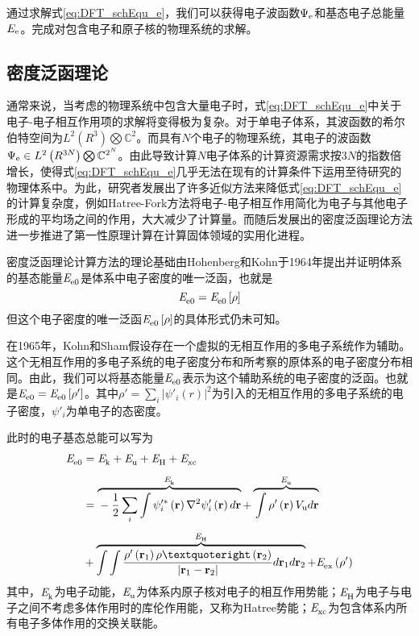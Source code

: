 通过求解式\ref{eq:DFT_schEqu_e}，我们可以获得电子波函数$\Psi_{\rm e}$和基态电子总能量$E_{\rm e}$。完成对包含电子和原子核的物理系统的求解。

\subsection{密度泛函理论}
通常来说，当考虑的物理系统中包含大量电子时，式\ref{eq:DFT_schEqu_e}中关于电子-电子相互作用项的求解将变得极为复杂。对于单电子体系，其波函数的希尔伯特空间为$L^2\left(R^3\right)\bigotimes \mathbb{C}^2$。而具有$N$个电子的物理系统，其电子的波函数$\Psi_{\rm e}\in L^2\left(R^{3N}\right)\bigotimes \mathbb{C}^{2^N}$。由此导致计算$N$电子体系的计算资源需求按$3N$的指数倍增长，使得式\ref{eq:DFT_schEqu_e}几乎无法在现有的计算条件下运用至待研究的物理体系中。为此，研究者发展出了许多近似方法来降低式\ref{eq:DFT_schEqu_e}的计算复杂度，例如Hatree-Fork方法将电子-电子相互作用简化为电子与其他电子形成的平均场之间的作用，大大减少了计算量。而随后发展出的密度泛函理论方法进一步推进了第一性原理计算在计算固体领域的实用化进程。

密度泛函理论计算方法的理论基础由Hohenberg和Kohn于1964年提出并证明\chinesecolon 体系的基态能量$\it E_{\rm e0}^{\rm } \it$是体系中电子密度的唯一泛函，也就是
\[
    \it E_{\rm e0}^{\rm } \it=\it E_{\rm e0}^{\rm } \it\left[\rho\right]
\]
但这个电子密度的唯一泛函$\it E_{\rm e0}^{\rm } \it\left[\rho\right]$的具体形式仍未可知。

在1965年，Kohn和Sham假设存在一个虚拟的无相互作用的多电子系统作为辅助。这个无相互作用的多电子系统的电子密度分布和所考察的原体系的电子密度分布相同。由此，我们可以将基态能量$\it E_{\rm e0}^{\rm } \it$表示为这个辅助系统的电子密度的泛函。也就是$\it E_{\rm e0}^{\rm } \it=\it E_{\rm e0}^{\rm } \it\left[\rho'\right]$。其中$\rho'=\sum_i\left\lvert \psi' _i\left(r\right)\right\rvert^2$为引入的无相互作用的多电子系统的电子密度，$\psi'_i$为单电子的态密度。

此时的电子基态总能可以写为\chinesecolon
\begin{equation}
    \label{eq:DFT_Ee0_ks}
    \begin{split}
        \energyVar{e0}{}&=\energyVar{k}{}+\energyVar{u}{}+\energyVar{H}{}+\energyVar{xc}{}\\[+1ex]
        &=\overbrace{\rule[0ex]{0ex}{3.2ex}-\frac{1}{2}\sum_i\int\psi'^*_i\left({\bm r}\right)\nabla^2\psi'_i\left({\bm r}\right)d{\bm r}}^{\energyVar{k}{}} + \overbrace{\rule[0ex]{0ex}{3.2ex}\int\rho'\left({\bm r}\right)V_{\rm u}d{\bm r}}^{\energyVar{u}{}}\\[+1ex]
        &+\overbrace{\int\int \frac{\rho'\left({\bm r}_1\right)\rho’\left({\bm r}_2\right)}{\left\lvert{\bm r}_1 - {\bm r}_2\right\rvert}d{\bm r}_1d{\bm r}_2}^{\energyVar{H}{}}+\energyVar{ex}{}\left(\rho'\right)
    \end{split}
\end{equation}
其中，$\it E_{\rm k}^{\rm } \it$为电子动能，$\it E_{\rm u}^{\rm } \it$为体系内原子核对电子的相互作用势能；$\it E_{\rm H}^{\rm } \it$为电子与电子之间不考虑多体作用时的库伦作用能，又称为Hatree势能；$\it E_{\rm xc}^{\rm } \it$为包含体系内所有电子多体作用的交换关联能。

